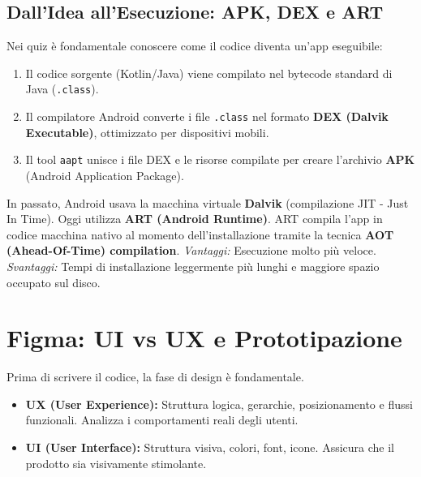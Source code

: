 \subsection{Dall'Idea all'Esecuzione: APK, DEX e ART}
Nei quiz è fondamentale conoscere come il codice diventa un'app eseguibile:
\begin{enumerate}
    \item Il codice sorgente (Kotlin/Java) viene compilato nel bytecode standard di Java (\texttt{.class}).
    \item Il compilatore Android converte i file \texttt{.class} nel formato \textbf{DEX (Dalvik Executable)}, ottimizzato per dispositivi mobili.
    \item Il tool \texttt{aapt} unisce i file DEX e le risorse compilate per creare l'archivio \textbf{APK} (Android Application Package).
\end{enumerate}

\begin{tcolorbox}[colback=blue!5!white,colframe=blue!75!black,title=Android Runtime (ART) vs Dalvik]
    In passato, Android usava la macchina virtuale \textbf{Dalvik} (compilazione JIT - Just In Time).
    Oggi utilizza \textbf{ART (Android Runtime)}.
    ART compila l'app in codice macchina nativo al momento dell'installazione tramite la tecnica \textbf{AOT (Ahead-Of-Time) compilation}.
    \newline\textit{Vantaggi:} Esecuzione molto più veloce. \newline\textit{Svantaggi:} Tempi di installazione leggermente più lunghi e maggiore spazio occupato sul disco.
\end{tcolorbox}

\section{Figma: UI vs UX e Prototipazione}
Prima di scrivere il codice, la fase di design è fondamentale.
\begin{itemize}
    \item \textbf{UX (User Experience):} Struttura logica, gerarchie, posizionamento e flussi funzionali.
    Analizza i comportamenti reali degli utenti.
    \item \textbf{UI (User Interface):} Struttura visiva, colori, font, icone.
    Assicura che il prodotto sia visivamente stimolante.
\end{itemize}

